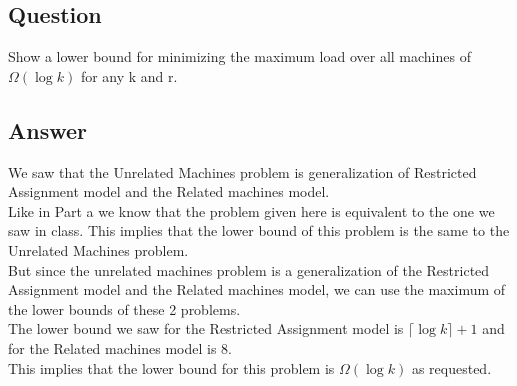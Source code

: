 \subsection{Question}
Show a lower bound for minimizing the maximum load over all machines of $\Omega(\log k)$ for any k
and r.
\subsection{Answer}
We saw that the Unrelated Machines problem is generalization of Restricted Assignment model and the Related machines model.\\
Like in Part a we know that the problem given here is equivalent to the one we saw in class. This implies that the lower bound of this problem is the same to the Unrelated Machines problem.\\
But since the unrelated machines problem is a generalization of the Restricted Assignment model and the Related machines model, we can use the maximum of the lower bounds of these 2 problems.\\
The lower bound we saw for the Restricted Assignment model is $ \lceil \log k \rceil + 1 $ and for the Related machines model is $8$.\\
This implies that the lower bound for this problem is $\Omega(\log k)$ as requested.
